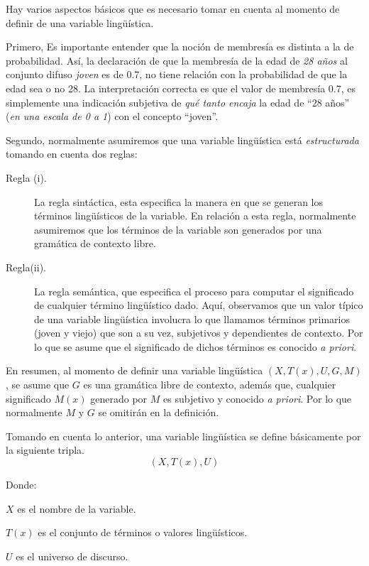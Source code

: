 Hay varios aspectos básicos que es necesario tomar en cuenta al momento de definir de una variable lingüística.

Primero, Es importante entender que la noción de membresía es distinta a la de probabilidad. Así, la declaración de que la membresía de la edad de \emph{28 años} al conjunto difuso \emph{joven} es de 0.7, no tiene relación con la probabilidad de que la edad sea o no 28.
La interpretación correcta es que el valor de membresía 0.7, es simplemente una indicación subjetiva de \emph{qué tanto encaja} la edad de ``28 años'' (\textit{en una escala de 0 a 1}) con el concepto ``joven''.

Segundo, normalmente asumiremos que una variable lingüística está \emph{estructurada} tomando en cuenta dos reglas:
\begin{description}
	\item[Regla (i).] La regla sintáctica, esta especifica la manera en que se generan los términos lingüísticos de la variable.
	En relación a esta regla, normalmente asumiremos que los términos de la variable son generados por una gramática de contexto libre.
	\item[Regla(ii).] La regla semántica, que especifica el proceso para computar el significado de cualquier término lingüístico dado. Aquí, observamos que un valor típico de una variable lingüística involucra lo que llamamos términos primarios (joven y viejo) que son a su vez, subjetivos y dependientes de contexto. Por lo que se asume que el significado de dichos términos es conocido \emph{a priori}.
\end{description}

En resumen, al momento de definir una variable lingüística $(X,T(x),U,G,M)$, se asume que $G$ es una gramática libre de contexto, además que,
cualquier significado $M(x)$  generado por $M$ es subjetivo y conocido \emph{a priori}. Por lo que normalmente $M$ y $G$ se omitirán en la definición.

Tomando en cuenta lo anterior, una variable lingüística se define básicamente por la siguiente tripla.
$$(X,T(x),U)$$

Donde:
{\setlength{\baselineskip}{0.7\baselineskip}\begin{description}
	\item $X$ es el nombre de la variable.
	\item $T(x)$ es el conjunto de términos o valores lingüísticos.
	\item $U$ es el universo de discurso.
\end{description}}


